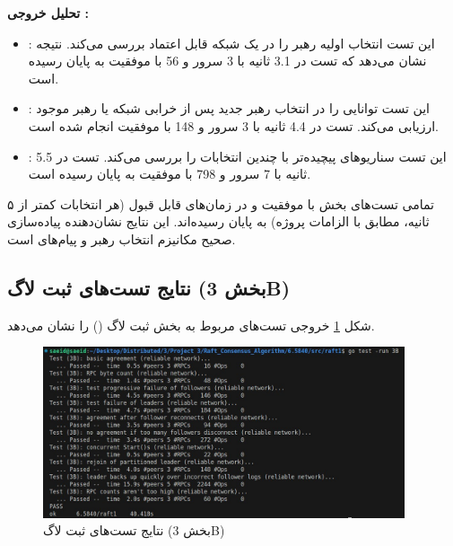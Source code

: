 \documentclass[12pt,a4paper]{article}
\begin{document}
\textbf{تحلیل خروجی :}
\begin{itemize}
    \item {}: این تست انتخاب اولیه رهبر را در یک شبکه قابل اعتماد بررسی می‌کند. نتیجه نشان می‌دهد که تست در 3.1 ثانیه با 3 سرور و 56  با موفقیت به پایان رسیده است.
    \item {}: این تست توانایی  را در انتخاب رهبر جدید پس از خرابی شبکه یا رهبر موجود ارزیابی می‌کند. تست در 4.4 ثانیه با 3 سرور و 148  با موفقیت انجام شده است.
    \item {}: این تست سناریوهای پیچیده‌تر با چندین انتخابات را بررسی می‌کند. تست در 5.5 ثانیه با 7 سرور و 798  با موفقیت به پایان رسیده است.
\end{itemize}

تمامی تست‌های بخش  با موفقیت و در زمان‌های قابل قبول (هر انتخابات کمتر از ۵ ثانیه، مطابق با الزامات پروژه) به پایان رسیده‌اند. این نتایج نشان‌دهنده پیاده‌سازی صحیح مکانیزم انتخاب رهبر و پیام‌های  است.

\subsection{نتایج تست‌های ثبت لاگ (بخش 3B)}

شکل \ref{fig:3B} خروجی تست‌های مربوط به بخش ثبت لاگ () را نشان می‌دهد.

\begin{figure}[H]
    \centering
    \includegraphics[width=0.95\textwidth]{3B.jpg}
    \caption{نتایج تست‌های ثبت لاگ (بخش 3B)}
    \label{fig:3B}
\end{figure}
\end{document}
